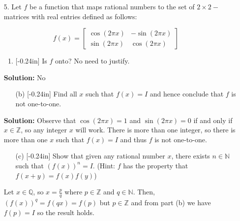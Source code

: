 \documentclass[letterpaper,12pt]{article}
\theoremstyle{definition}
\begin{document}
\newpage
\begin{enumerate}
    \item[5.] Let $f$ be a function that maps rational numbers to the set of $2\times2-$matrices with real entries defined as follows:
\end{enumerate}
$$f(x) = \begin{bmatrix}
    \cos(2\pi x) & -\sin(2\pi x) \\ \sin(2\pi x) & \cos(2\pi x)
\end{bmatrix}$$
\begin{enumerate}
    \item[] \begin{enumerate}
        \item\reversemarginpar{}[-0.24in] Is $f$ onto? No need to justify.
        \end{enumerate}
        \begin{mdframed}
            \textbf{Solution:} No
        \end{mdframed}
        \vspace{0.2in}
        \begin{enumerate}
        \item[(b)]\reversemarginpar{}[-0.24in] Find all $x$ such that $f(x) = I$ and hence conclude that $f$ is not one-to-one.
    \end{enumerate}
    \begin{mdframed}
            \textbf{Solution:} Observe that $\cos(2\pi x) = 1$ and $\sin(2\pi x) = 0$ if and only if $x \in \mathbb{Z}$, so any integer $x$ will work. There is more than one integer, so there is more than one $x$ such that $f(x) = I$ and thus $f$ is not one-to-one.
        \end{mdframed}
\end{enumerate}
\newpage
\begin{enumerate}
    \item[] \begin{enumerate}
        \item[(c)]\reversemarginpar{}[-0.24in] Show that given any rational number $x$, there exists $n \in \mathbb{N}$ such that $(f(x))^n = I$. (Hint: $f$ has the property that $f(x+y) = f(x)f(y)$)
    \end{enumerate}
    \begin{mdframed}
        Let $x \in \mathbb{Q}$, so $x = \frac{p}{q}$ where $p \in \mathbb{Z}$ and $q \in \mathbb{N}$. Then, $(f(x))^q = f(qx) = f(p)$ but $p \in \mathbb{Z}$ and from part (b) we have $f(p) = I$ so the result holds.
    \end{mdframed}
\end{enumerate}
\end{document}
